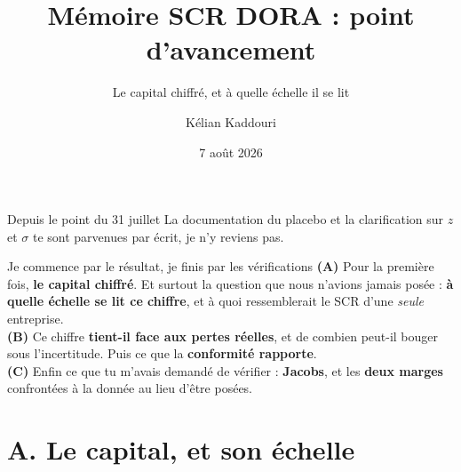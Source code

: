 \documentclass[11pt]{beamer}
\title[Point d'avancement]{Mémoire SCR DORA : point d'avancement}
\subtitle{Le capital chiffré, et à quelle échelle il se lit}
\author[K. Kaddouri]{Kélian Kaddouri}
\institute[ENSAE / Nexialog]{ENSAE / Nexialog Consulting}
\date[07/08/2026]{7 août 2026}
\begin{document}
\begin{frame}
\titlepage
\end{frame}

\begin{frame}{Depuis le point du 31 juillet}
La documentation du placebo et la clarification sur $z$ et $\sigma$ te sont parvenues par
écrit, je n'y reviens pas.
\vfill
\begin{block}{Je commence par le résultat, je finis par les vérifications}
\textbf{(A)} Pour la première fois, \textbf{le capital chiffré}. Et surtout la question que
nous n'avions jamais posée : \textbf{à quelle échelle se lit ce chiffre}, et à quoi
ressemblerait le SCR d'une \emph{seule} entreprise.\\[3pt]
\textbf{(B)} Ce chiffre \textbf{tient-il face aux pertes réelles}, et de combien peut-il
bouger sous l'incertitude. Puis ce que la \textbf{conformité rapporte}.\\[3pt]
\textbf{(C)} Enfin ce que tu m'avais demandé de vérifier : \textbf{Jacobs}, et les
\textbf{deux marges} confrontées à la donnée au lieu d'être posées.
\end{block}
\end{frame}

\section*{A. Le capital, et son échelle}
\end{document}
